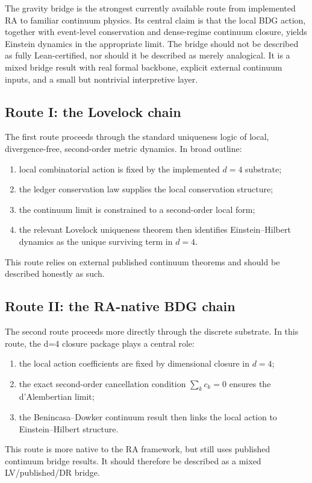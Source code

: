 \documentclass[11pt]{article}
\begin{document}
The gravity bridge is the strongest currently available route from implemented RA to familiar continuum physics. Its central claim is that the local BDG action, together with event-level conservation and dense-regime continuum closure, yields Einstein dynamics in the appropriate limit. The bridge should not be described as fully Lean-certified, nor should it be described as merely analogical. It is a mixed bridge result with real formal backbone, explicit external continuum inputs, and a small but nontrivial interpretive layer.

\subsection{Route I: the Lovelock chain}
The first route proceeds through the standard uniqueness logic of local, divergence-free, second-order metric dynamics. In broad outline:
\begin{enumerate}[label=\arabic*.]
    \item local combinatorial action is fixed by the implemented $d=4$ substrate;
    \item the ledger conservation law supplies the local conservation structure;
    \item the continuum limit is constrained to a second-order local form;
    \item the relevant Lovelock uniqueness theorem then identifies Einstein--Hilbert dynamics as the unique surviving term in $d=4$.
\end{enumerate}
This route relies on external published continuum theorems and should be described honestly as such.

\subsection{Route II: the RA-native BDG chain}
The second route proceeds more directly through the discrete substrate. In this route, the d=4 closure package plays a central role:
\begin{enumerate}[label=\arabic*.]
    \item the local action coefficients are fixed by dimensional closure in $d=4$;
    \item the exact second-order cancellation condition $\sum_k c_k = 0$ ensures the d'Alembertian limit;
    \item the Benincasa--Dowker continuum result then links the local action to Einstein--Hilbert structure.
\end{enumerate}
This route is more native to the RA framework, but still uses published continuum bridge results. It should therefore be described as a mixed LV/published/DR bridge.
\end{document}
